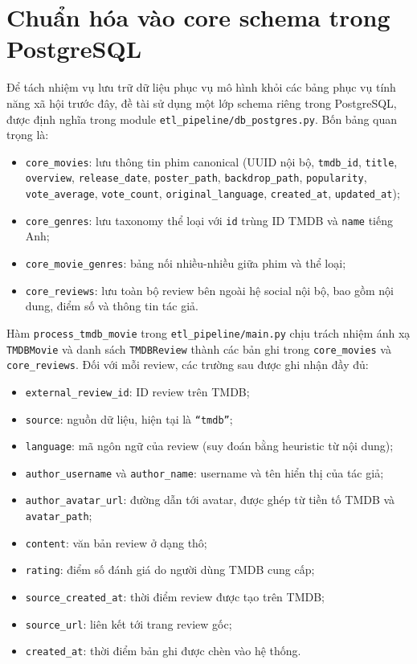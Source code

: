 \section{Chuẩn hóa vào core schema trong PostgreSQL}
Để tách nhiệm vụ lưu trữ dữ liệu phục vụ mô hình khỏi các bảng phục vụ tính năng xã hội trước đây, đề tài sử dụng một lớp schema riêng trong PostgreSQL, được định nghĩa trong module \texttt{etl\_pipeline/db\_postgres.py}. Bốn bảng quan trọng là:
\begin{itemize}
    \item \texttt{core\_movies}: lưu thông tin phim canonical (UUID nội bộ, \texttt{tmdb\_id}, \texttt{title}, \texttt{overview}, \texttt{release\_date}, \texttt{poster\_path}, \texttt{backdrop\_path}, \texttt{popularity}, \texttt{vote\_average}, \texttt{vote\_count}, \texttt{original\_language}, \texttt{created\_at}, \texttt{updated\_at});
    \item \texttt{core\_genres}: lưu taxonomy thể loại với \texttt{id} trùng ID TMDB và \texttt{name} tiếng Anh;
    \item \texttt{core\_movie\_genres}: bảng nối nhiều-nhiều giữa phim và thể loại;
    \item \texttt{core\_reviews}: lưu toàn bộ review bên ngoài hệ social nội bộ, bao gồm nội dung, điểm số và thông tin tác giả.
\end{itemize}

Hàm \texttt{process\_tmdb\_movie} trong \texttt{etl\_pipeline/main.py} chịu trách nhiệm ánh xạ \texttt{TMDBMovie} và danh sách \texttt{TMDBReview} thành các bản ghi trong \texttt{core\_movies} và \texttt{core\_reviews}. Đối với mỗi review, các trường sau được ghi nhận đầy đủ:
\begin{itemize}
    \item \texttt{external\_review\_id}: ID review trên TMDB;
    \item \texttt{source}: nguồn dữ liệu, hiện tại là \texttt{``tmdb''};
    \item \texttt{language}: mã ngôn ngữ của review (suy đoán bằng heuristic từ nội dung);
    \item \texttt{author\_username} và \texttt{author\_name}: username và tên hiển thị của tác giả;
    \item \texttt{author\_avatar\_url}: đường dẫn tới avatar, được ghép từ tiền tố TMDB và \texttt{avatar\_path};
    \item \texttt{content}: văn bản review ở dạng thô;
    \item \texttt{rating}: điểm số đánh giá do người dùng TMDB cung cấp;
    \item \texttt{source\_created\_at}: thời điểm review được tạo trên TMDB;
    \item \texttt{source\_url}: liên kết tới trang review gốc;
    \item \texttt{created\_at}: thời điểm bản ghi được chèn vào hệ thống.
\end{itemize}

